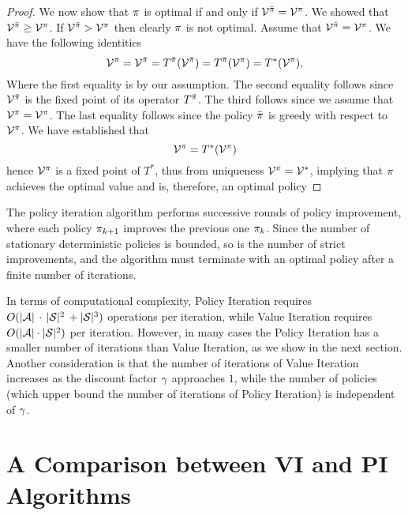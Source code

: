 \begin{proof}
We now show that $\pi$ is optimal if and only if ${\mathcal{V}^{\bar
{\pi} }} ={\mathcal{V}^\pi }$. We showed that ${\mathcal{V}^{\bar
{\pi} }} \ge {\mathcal{V}^\pi}$. If ${\mathcal{V}^{\bar {\pi} }} >
{\mathcal{V}^\pi }$ then clearly $\pi$ is not optimal. Assume
that ${\mathcal{V}^{\bar {\pi} }} = {\mathcal{V}^\pi }$. We have the
following identities
\[
\mathcal{V}^{ \pi }= \mathcal{V}^{\bar {\pi} } = T^{\bar {\pi}}(\mathcal{V}^{\bar {\pi} })=T^{\bar {\pi} }(\mathcal{V}^{\pi})
=T^*(\mathcal{V}^{ \pi }),
\]
Where the first equality is by our assumption. The second equality
follows since $\mathcal{V}^{\bar {\pi} } $ is the fixed point of its
operator $T^{\bar {\pi} }$. The third follows since we assume that
${\mathcal{V}^{\bar {\pi} }} = {\mathcal{V}^\pi }$. The last equality
follows since the policy $\bar{\pi}$ is greedy with respect to ${\mathcal{V}^\pi}$.
We have established that
\[\mathcal{V}^{ \pi } =T^*(\mathcal{V}^{ \pi
})\]
hence $\mathcal{V}^{ \pi }$ is a fixed point of $T^*$, 
thus from uniqueness $\mathcal{V}^{ \pi } = \mathcal{V}^{*}$, 
implying that $\pi$ achieves the optimal value and is, therefore, an optimal policy
\end{proof}

The policy iteration algorithm performs successive rounds of policy
improvement, where each policy ${\pi _{k + 1}}$ improves the
previous one ${\pi _k}$. Since the number of stationary deterministic policies
is bounded, so is the number of strict improvements, and the
algorithm must terminate with an optimal policy after a finite
number of iterations.

In terms of computational complexity, Policy Iteration requires
$O(|\mathcal{A}|\, \cdot \,|\mathcal{S}|^2\, + |\mathcal{S}|^3)$ operations per
iteration, while Value Iteration requires $O(|\mathcal{A}| \cdot
|\mathcal{S}|^2)$ per iteration.
%
However, in many cases the Policy Iteration has a smaller number of
iterations than Value Iteration, as we show in the next section.
%
Another consideration is that the number of iterations of Value
Iteration increases as the discount factor $\gamma $ approaches
$1$, while the number of policies (which upper bound the number of
iterations of Policy Iteration) is independent of $\gamma$.


\section{A Comparison between VI and PI Algorithms}

